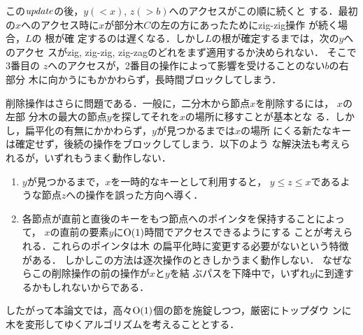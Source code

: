 この${\it update\/}$の後，$y(<x)$, $z(>b)$へのアクセスがこの順に続くと
する．最初の$x$へのアクセス時に$x$が部分木$C$の左の方にあったためにzig-zig操作
が続く場合，$L$の
根が確
定するのは遅くなる．しかし$L$の根が確定するまでは，次の$y$へのアクセ
スがzig, zig-zig, zig-zagのどれをまず適用するか決められない．
%
%
そこで3番目の
$z$へのアクセスが，2番目の操作によって影響を受けることのない$b$の右部分
木に向かうにもかかわらず，長時間ブロックしてしまう．

削除操作はさらに問題である．一般に，二分木から節点$x$を削除するには，
$x$の左部
分木の最大の節点$y$を探してそれを$x$の場所に移すことが基本とな
る．しかし，扁平化の有無にかかわらず，$y$が見つかるまでは$x$の場所
にくる新たなキーは確定せず，後続の操作をブロックしてしまう．以下のよう
な解決法も考えられるが，いずれもうまく動作しない．

\begin{enumerate}
\item %
$y$が見つかるまで，$x$を一時的なキーとして利用すると，
$y\le z\le x$であるような節点$z$への操作を誤った方向へ導く．

\item %
各節点が直前と直後のキーをもつ節点へのポインタを保持することによって，
$x$の直前の要素$y$に${\rm O}(1)$時間でアクセスできるようにする
ことが考えられる．これらのポインタは木
の扁平化時に変更する必要がないという特徴がある．
%
しかしこの方法は逐次操作のときしかうまく動作しない．
%
%
なぜならこの削除操作の前の操作が$x$と$y$を結
ぶパスを下降中で，いずれ$y$に到達するかもしれないからである．
\end{enumerate}

したがって本論文では，高々${\rm O}(1)$個の節を施錠しつつ，厳密にトップダウ
ンに木を変形してゆくアルゴリズムを考えることとする．
